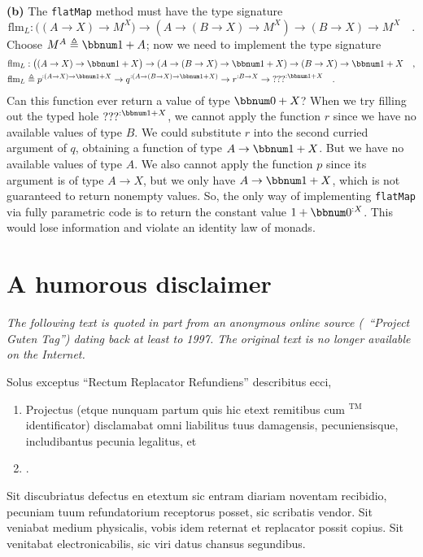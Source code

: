 \textbf{(b)} The \lstinline!flatMap! method must have the type signature
\[
\text{flm}_{L}:\big((A\rightarrow X)\rightarrow M^{X}\big)\rightarrow(A\rightarrow(B\rightarrow X)\rightarrow M^{X})\rightarrow(B\rightarrow X)\rightarrow M^{X}\quad.
\]
Choose $M^{A}\triangleq\bbnum 1+A$; now we need to implement the
type signature
\begin{align*}
 & \text{flm}_{L}:\big((A\rightarrow X)\rightarrow\bbnum 1+X\big)\rightarrow\left(A\rightarrow(B\rightarrow X)\rightarrow\bbnum 1+X\right)\rightarrow(B\rightarrow X)\rightarrow\bbnum 1+X\quad,\\
 & \text{flm}_{L}\triangleq p^{:(A\rightarrow X)\rightarrow\bbnum 1+X}\rightarrow q^{:\left(A\rightarrow(B\rightarrow X)\rightarrow\bbnum 1+X\right)}\rightarrow r^{:B\rightarrow X}\rightarrow\text{???}^{:\bbnum 1+X}\quad.
\end{align*}
Can this function ever return a value of type $\bbnum 0+X$? When
we try filling out the typed hole $\text{???}^{:\bbnum 1+X}$, we
cannot apply the function $r$ since we have no available values of
type $B$. We could substitute $r$ into the second curried argument
of $q$, obtaining a function of type $A\rightarrow\bbnum 1+X$. But
we have no available values of type $A$. We also cannot apply the
function $p$ since its argument is of type $A\rightarrow X$, but
we only have $A\rightarrow\bbnum 1+X$, which is not guaranteed to
return nonempty values. So, the only way of implementing \lstinline!flatMap!
via fully parametric code is to return the constant value $1+\bbnum 0^{:X}$.
This would lose information and violate an identity law of monads.

\chapter{A humorous disclaimer}

\emph{The following text is quoted in part from an anonymous online
source (~\textsf{``}Project Guten Tag\textsf{''}) dating back at least to 1997. The
original text is no longer available on the Internet.}

\medskip{}


Solus exceptus \textsf{``}Rectum Replacator Refundiens\textsf{''} describitus ecci,
\begin{enumerate}
\item Projectus (etque nunquam partum quis hic etext remitibus cum $^{\text{TM}}$ identificator) disclamabat omni liabilitus
tuus damagensis, pecuniensisque, includibantus pecunia legalitus,
et 
\item {}. 
\end{enumerate}
Sit discubriatus defectus en etextum sic entram diariam noventam recibidio,
pecuniam tuum refundatorium receptorus posset, sic scribatis vendor.
Sit veniabat medium physicalis, vobis idem reternat et replacator
possit copius. Sit venitabat electronicabilis, sic viri datus chansus
segundibus. 

